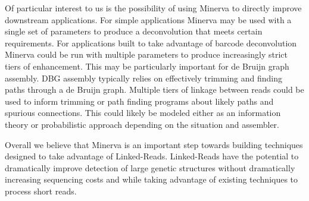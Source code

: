 Of particular interest to us is the possibility of using Minerva to directly improve downstream applications. For simple applications Minerva may be used with a single set of parameters to produce a deconvolution that meets certain requirements. For applications built to take advantage of barcode deconvolution Minerva could be run with multiple parameters to produce increasingly strict tiers of enhancement. This may be particularly important for de Bruijn graph assembly. DBG assembly typically relies on effectively trimming and finding paths through a de Bruijn graph. Multiple tiers of linkage between reads could be used to inform trimming or path finding programs about likely paths and spurious connections. This could likely be modeled either as an information theory or probabilistic approach depending on the situation and assembler. 

Overall we believe that Minerva is an important step towards building techniques designed to take advantage of Linked-Reads. Linked-Reads have the potential to dramatically improve detection of large genetic structures without dramatically increasing sequencing costs and while taking advantage of existing techniques to process short reads.





